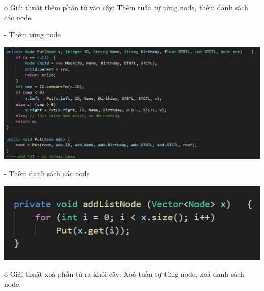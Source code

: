 \documentclass{report}
\begin{document}
\smallskip      
o Giải thuật thêm phần tử vào cây: Thêm tuần tự từng node, thêm danh sách các node.

- Thêm từng node
  \begin{center}
     \includegraphics[scale=0.65]{h}
    \end{center}
    
- Thêm danh sách các node
\begin{center}
     \includegraphics[scale=1]{i}
    \end{center}

o Giải thuật xoá phần tử ra khỏi cây: Xoá tuần tự từng node, xoá danh sách node.
\end{document}
